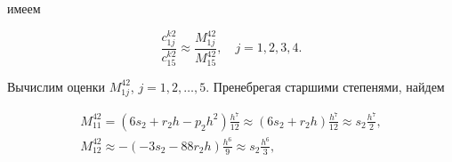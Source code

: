 имеем

\begin{equation}

\label{mvc:eq55}

   \frac{c_{1j}^{k2}}{c_{15}^{k2}}\approx\frac{M_{1j}^{42}}{M_{15}^{42}},\quad 

j=1,  2,  3,  4.

\end{equation}



Вычислим оценки $M_{1j}^{42}$, $j=1,  2,  \dots,  5$. Пренебрегая старшими степенями, найдем

\begin{gather}

\label{mvc:eq56}

M_{11}^{42}=











   (6s_2+r_2h - p_2h^2)\frac{h^7}{12}\approx  (6s_2 + r_2h)\frac{h^7}{12}

 \approx  s_2\frac{h^7}{2},



\\

\label{mvc:eq59}  

M_{12}^{42}\approx

  -(-3s_2 - 88r_2h )\frac{h^6}{9}\approx  s_2\frac{h^6}{3},




\end{gather}
